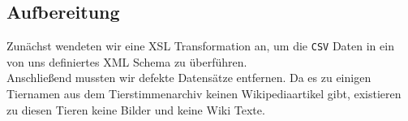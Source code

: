 \documentclass[a4paper,10pt]{article}
\begin{document}
       \subsection{Aufbereitung}
           Zunächst wendeten wir eine XSL Transformation an, um die \texttt{CSV} Daten in
           ein von uns definiertes XML Schema zu überführen.\\
           Anschließend mussten wir defekte Datensätze entfernen. Da es zu einigen Tiernamen aus
           dem Tierstimmenarchiv keinen Wikipediaartikel gibt, existieren zu diesen
           Tieren keine Bilder und keine Wiki Texte.
\end{document}
